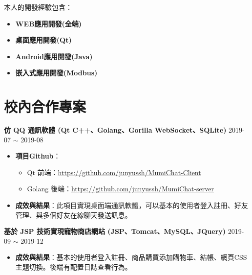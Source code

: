 \documentclass[classical]{einfart}
\begin{document}
本人的開發經驗包含：

\begin{itemize}[parsep=0.5ex]
  \item \textbf{WEB應用開發(全端)}
  \item \textbf{桌面應用開發(Qt)}
  \item \textbf{Android應用開發(Java)}
  \item \textbf{嵌入式應用開發(Modbus)}
\end{itemize}

\section{校內合作專案}

\textbf{仿 QQ 通訊軟體 (Qt C++、Golang、Gorilla WebSocket、SQLite)} \hfill 2019-07 $\sim$ 2019-08

\begin{itemize}[parsep=0.5ex]

  \item \textbf{項目Github}：
  
  \begin{itemize}[parsep=0.5ex]
    \item Qt 前端：\href{https://github.com/junyussh/MumiChat-Client}{https://github.com/junyussh/MumiChat-Client}
    \item Golang 後端：\href{https://github.com/junyussh/MumiChat-server}{https://github.com/junyussh/MumiChat-server}
  \end{itemize}

  \item \textbf{成效與結果}：此項目實現桌面端通訊軟體，可以基本的使用者登入註冊、好友管理、與多個好友在線聊天發送訊息。

\end{itemize}

\newline

\textbf{基於 JSP 技術實現寵物商店網站 (JSP、Tomcat、MySQL、JQuery)} \hfill 2019-09 $\sim$ 2019-12

\begin{itemize}[parsep=0.5ex]

  \item \textbf{成效與結果}：基本的使用者登入註冊、商品購買添加購物車、結帳、網頁CSS主題切換。後端有配置日誌查看行為。

\end{itemize}

\newline
\end{document}
